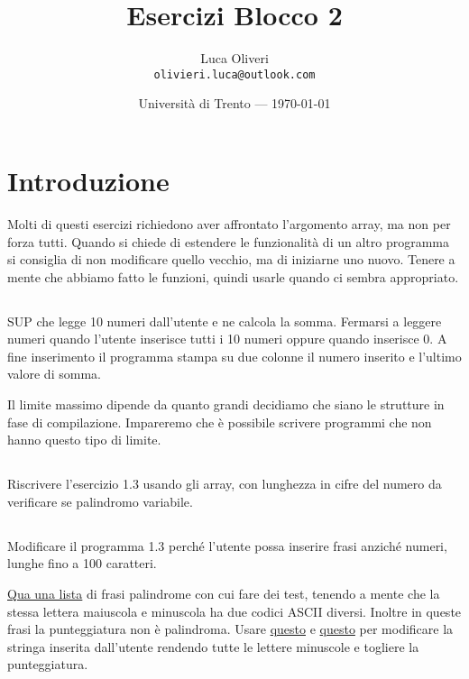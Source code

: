 \documentclass{article}
\title{Esercizi Blocco 2} %
\author{Luca Oliveri\\ \texttt{olivieri.luca@outlook.com}} %
\date{Università di Trento --- \today} %
\begin{document}
\maketitle %

\section*{Introduzione} %
Molti di questi esercizi richiedono aver affrontato l'argomento array, ma non per forza tutti. Quando si chiede di estendere le funzionalità di un altro programma si consiglia di non modificare quello vecchio, ma di iniziarne uno nuovo. Tenere a mente che abbiamo fatto le funzioni, quindi usarle quando ci sembra appropriato.

\setcounter{section}{2}


\subsection{}
SUP che legge 10 numeri dall'utente e ne calcola la somma. Fermarsi a leggere numeri quando l'utente inserisce tutti i 10 numeri oppure quando inserisce 0. A fine inserimento il programma stampa su due colonne il numero inserito e l'ultimo valore di somma.
\begin{info} 
	Il limite massimo dipende da quanto grandi decidiamo che siano le strutture in fase di compilazione. Impareremo che è possibile scrivere programmi che non hanno questo tipo di limite.
\end{info}

\subsection{}
Riscrivere l'esercizio 1.3 usando gli array, con lunghezza in cifre del numero da verificare se palindromo variabile.

\subsection{}
Modificare il programma 1.3 perché l'utente possa inserire frasi anziché numeri, lunghe fino a 100 caratteri. 
\begin{info}
	\href{https://www2.cs.arizona.edu/icon/oddsends/palinsen.htm}{Qua una lista} di frasi palindrome con cui fare dei test, tenendo a mente che la stessa lettera maiuscola e minuscola ha due codici ASCII diversi. Inoltre in queste frasi la punteggiatura non è palindroma. Usare \href{http://www.cplusplus.com/reference/cctype/tolower/}{questo} e \href{http://www.cplusplus.com/reference/cctype/ispunct/}{questo} per modificare la stringa inserita dall'utente rendendo tutte le lettere minuscole e togliere la punteggiatura.
\end{info}
\end{document}
